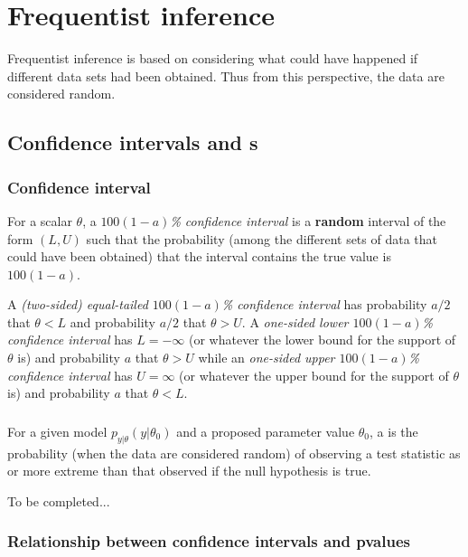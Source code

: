 
\chapter{Frequentist inference}

Frequentist inference is based on considering what could have happened if 
different data sets had been obtained.
Thus from this perspective, 
the data are considered random.


\section{Confidence intervals and \pvalue{}s}

\subsection{Confidence interval}

For a scalar $\theta$,
a \emph{$100(1-a)$\% confidence interval} is a {\bf random} interval of the form 
$(L,U)$ such that the probability (among the different sets of data that could 
have been obtained) that the interval contains the true value is $100(1-a)$.

A \emph{(two-sided) equal-tailed $100(1-a)$\% confidence interval} has 
probability $a/2$ that $\theta<L$ and 
probability $a/2$ that $\theta>U$.
A \emph{one-sided lower $100(1-a)$\% confidence interval} has $L=-\infty$ 
(or whatever the lower bound for the support of $\theta$ is) and
probability $a$ that $\theta>U$
while an \emph{one-sided upper $100(1-a)$\% confidence interval} has $U=\infty$ 
(or whatever the upper bound for the support of $\theta$ is) and
probability $a$ that $\theta<L$.





\subsection{\pvalue{}}

For a given model $p_{y|\theta}(y|\theta_0)$ and a proposed parameter value 
$\theta_0$, a \emph{\pvalue{}} is the probability 
(when the data are considered random)
of observing a test statistic as or more extreme than that observed if the null
hypothesis is true.

To be completed...

\subsection{Relationship between confidence intervals and pvalues}

